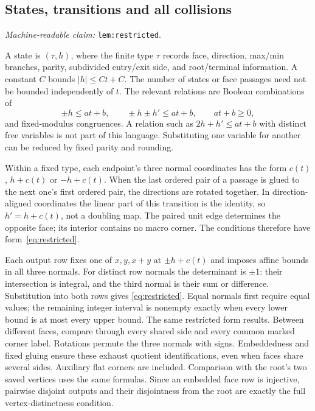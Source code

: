 \documentclass[11pt]{amsart}
\newcommand{\record}[1]{\nolinkurl{#1}}
\newcommand{\claimid}[1]{\par\nopagebreak\noindent\textit{Machine-readable claim:} \record{#1}.\par}
\theoremstyle{definition}\newtheorem{definition}{Definition}
\begin{document}
\subsection{States, transitions and all collisions}\label{lem:restricted}
\claimid{lem:restricted}
A state is $(\tau,h)$, where the finite type $\tau$ records face,
direction, max/min branches, parity, subdivided entry/exit side, and
root/terminal information. A constant $C$ bounds $|h|\le Ct+C$.
The number of states or face passages need not be bounded independently
of $t$. The relevant relations are Boolean combinations of
\begin{equation}\label{eq:restricted}
 \pm h\le at+b,\qquad \pm h\pm h'\le at+b,
 \qquad at+b\ge0,
\end{equation}
and fixed-modulus congruences. A relation such as $2h+h'\le at+b$
with distinct free variables is not part of this language. Substituting
one variable for another can be reduced by fixed parity and rounding.

Within a fixed type, each endpoint's three normal coordinates has the
form $c(t)$, $h+c(t)$ or $-h+c(t)$. When the last ordered pair of a
passage is glued to the next one's first ordered pair, the directions
are rotated together. In direction-aligned coordinates the linear part
of this transition is the identity, so $h'=h+c(t)$, not a doubling map.
The paired unit edge determines the opposite face; its interior
contains no macro corner. The conditions therefore have
form~\eqref{eq:restricted}.

Each output row fixes one of $x,y,x+y$ at $\pm h+c(t)$ and imposes
affine bounds in all three normals. For distinct row normals the
determinant is $\pm1$: their intersection is integral, and the third
normal is their sum or difference. Substitution into both rows gives
\eqref{eq:restricted}. Equal normals first require equal values;
the remaining integer interval is nonempty exactly when every lower
bound is at most every upper bound. The same restricted form results.
Between different faces, compare through every shared side and every
common marked corner label. Rotations permute the three normals with
signs. Embeddedness and fixed gluing ensure these exhaust quotient
identifications, even when faces share several sides. Auxiliary flat
corners are included. Comparison with the root's two saved vertices
uses the same formulas. Since an embedded face row is injective,
pairwise disjoint outputs and their disjointness from the root are
exactly the full vertex-distinctness condition.
\end{document}
